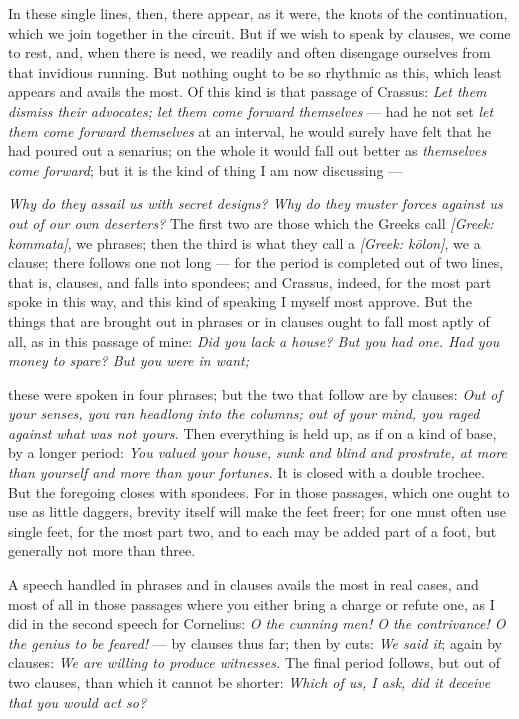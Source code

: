  In these single lines, then, there appear, as it were, the knots of the continuation, which we join together in the circuit. But if we wish to speak by clauses, we come to rest, and, when there is need, we readily and often disengage ourselves from that invidious running. But nothing ought to be so rhythmic as this, which least appears and avails the most. Of this kind is that passage of Crassus: \textit{Let them dismiss their advocates; let them come forward themselves} — had he not set \textit{let them come forward themselves} at an interval, he would surely have felt that he had poured out a senarius; on the whole it would fall out better as \textit{themselves come forward}; but it is the kind of thing I am now discussing —

 \textit{Why do they assail us with secret designs? Why do they muster forces against us out of our own deserters?} The first two are those which the Greeks call \textit{[Greek: kommata]}, we phrases; then the third is what they call a \textit{[Greek: kōlon]}, we a clause; there follows one not long — for the period is completed out of two lines, that is, clauses, and falls into spondees; and Crassus, indeed, for the most part spoke in this way, and this kind of speaking I myself most approve. But the things that are brought out in phrases or in clauses ought to fall most aptly of all, as in this passage of mine: \textit{Did you lack a house? But you had one. Had you money to spare? But you were in want;}

 these were spoken in four phrases; but the two that follow are by clauses: \textit{Out of your senses, you ran headlong into the columns; out of your mind, you raged against what was not yours.} Then everything is held up, as if on a kind of base, by a longer period: \textit{You valued your house, sunk and blind and prostrate, at more than yourself and more than your fortunes.} It is closed with a double trochee. But the foregoing closes with spondees. For in those passages, which one ought to use as little daggers, brevity itself will make the feet freer; for one must often use single feet, for the most part two, and to each may be added part of a foot, but generally not more than three.

 A speech handled in phrases and in clauses avails the most in real cases, and most of all in those passages where you either bring a charge or refute one, as I did in the second speech for Cornelius: \textit{O the cunning men! O the contrivance! O the genius to be feared!} — by clauses thus far; then by cuts: \textit{We said it}; again by clauses: \textit{We are willing to produce witnesses.} The final period follows, but out of two clauses, than which it cannot be shorter: \textit{Which of us, I ask, did it deceive that you would act so?}

